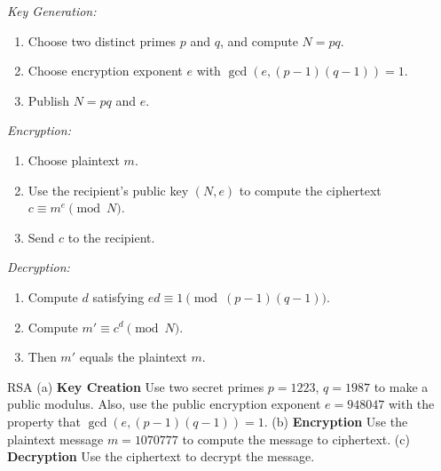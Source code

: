 \textit{Key Generation:}
\begin{enumerate}
    \item Choose two distinct primes \(p\) and \(q\), and compute \(N = pq\).
    \item Choose encryption exponent \(e\) with \(\gcd(e,(p-1)(q-1)) = 1\). 
    \item Publish \(N = pq\) and \(e\).
\end{enumerate}

\textit{Encryption:}
\begin{enumerate}
    \item Choose plaintext \(m\). 
    \item Use the recipient's public key \((N,e)\) to compute the ciphertext \(c \equiv m^e \pmod{N}\).
    \item Send \(c\) to the recipient.
\end{enumerate}

\textit{Decryption:}
\begin{enumerate}
    \item Compute \(d\) satisfying \(ed \equiv 1 \pmod{(p-1)(q-1)}\).
    \item Compute \(m' \equiv c^d \pmod{N}\).
    \item Then \(m'\) equals the plaintext \(m\).
\end{enumerate}

\begin{example}
    {RSA} (a) \textbf{Key Creation} Use two secret primes \(p = 1223\), \(q = 1987\) to make a public modulus. Also, use the public encryption exponent \(e = 948047\) with the property that \(\gcd(e,(p - 1)(q - 1)) = 1\). (b) \textbf{Encryption} Use the plaintext message \(m = 1070777\) to compute the message to ciphertext. (c) \textbf{Decryption} Use the ciphertext to decrypt the message.
\end{example}

